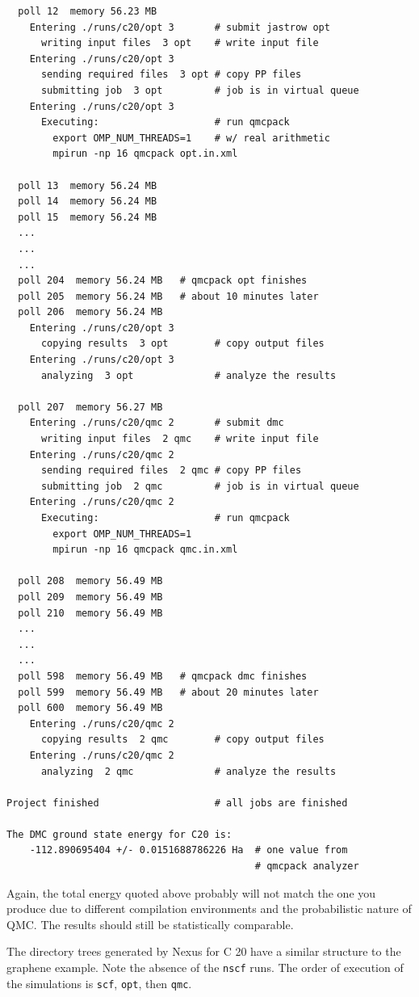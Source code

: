 \documentclass[oneside,11pt]{memoir}
\numberwithin{equation}{section}
\begin{document}
\begin{shaded}
\begin{verbatim}
  poll 12  memory 56.23 MB 
    Entering ./runs/c20/opt 3       # submit jastrow opt
      writing input files  3 opt    # write input file
    Entering ./runs/c20/opt 3 
      sending required files  3 opt # copy PP files
      submitting job  3 opt         # job is in virtual queue
    Entering ./runs/c20/opt 3 
      Executing:                    # run qmcpack
        export OMP_NUM_THREADS=1    # w/ real arithmetic
        mpirun -np 16 qmcpack opt.in.xml 

  poll 13  memory 56.24 MB 
  poll 14  memory 56.24 MB 
  poll 15  memory 56.24 MB 
  ...
  ...
  ...
  poll 204  memory 56.24 MB   # qmcpack opt finishes
  poll 205  memory 56.24 MB   # about 10 minutes later
  poll 206  memory 56.24 MB 
    Entering ./runs/c20/opt 3 
      copying results  3 opt        # copy output files
    Entering ./runs/c20/opt 3 
      analyzing  3 opt              # analyze the results

  poll 207  memory 56.27 MB 
    Entering ./runs/c20/qmc 2       # submit dmc
      writing input files  2 qmc    # write input file
    Entering ./runs/c20/qmc 2 
      sending required files  2 qmc # copy PP files
      submitting job  2 qmc         # job is in virtual queue
    Entering ./runs/c20/qmc 2 
      Executing:                    # run qmcpack
        export OMP_NUM_THREADS=1
        mpirun -np 16 qmcpack qmc.in.xml 

  poll 208  memory 56.49 MB 
  poll 209  memory 56.49 MB 
  poll 210  memory 56.49 MB 
  ...
  ...
  ...
  poll 598  memory 56.49 MB   # qmcpack dmc finishes
  poll 599  memory 56.49 MB   # about 20 minutes later
  poll 600  memory 56.49 MB 
    Entering ./runs/c20/qmc 2 
      copying results  2 qmc        # copy output files
    Entering ./runs/c20/qmc 2 
      analyzing  2 qmc              # analyze the results

Project finished                    # all jobs are finished
 
The DMC ground state energy for C20 is:
    -112.890695404 +/- 0.0151688786226 Ha  # one value from
                                           # qmcpack analyzer
\end{verbatim}
\end{shaded}

Again, the total energy quoted above probably will not match the one you produce 
due to different compilation environments and the probabilistic nature of 
QMC.  The results should still be statistically comparable.

The directory trees generated by Nexus for C 20 have a similar structure 
to the graphene example.  Note the absence of the \texttt{nscf} runs.  The order 
of execution of the simulations is \texttt{scf}, \texttt{opt}, then \texttt{qmc}.
\end{document}
